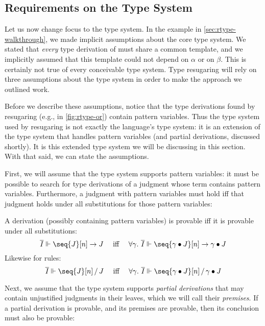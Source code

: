 \subsection{Requirements on the Type System}\label{sec:rtype-req-type}

Let us now change focus to the type system.
In the  example in \cref{sec:rtype-walkthrough}, we made implicit
assumptions about the core type system. We stated that \emph{every} type
derivation of  must share a common template,
and we implicitly assumed that this template could not depend on
$\alpha$ or on $\beta$.
This is certainly not true of every conceivable type system.
Type resugaring will rely on three assumptions about the
type system in order to make the approach we outlined work.

Before we describe these assumptions, notice that the type derivations
found by resugaring (e.g., in \cref{fig:rtype-or}) contain pattern
variables. Thus the type system used by resugaring is not exactly the
language's type system: it is an extension of the type system that
handles pattern variables (and partial derivations, discussed
shortly). It is this extended type system we will be discussing in
this section. With that said, we can state the assumptions.

First, we will assume that the type system
supports pattern variables: it
must be possible to search for type derivations of a judgment whose
term contains pattern variables. Furthermore, a judgment with pattern
variables must hold iff that judgment holds under all substitutions
for those pattern variables:

\begin{assumption}
  \label{assumption:rtype-substitution}
  A derivation (possibly containing pattern variables) is provable iff it is
  provable under all substitutions:
  \[\text{
    $\saysVD{\overline{I}}{\seq{J}[n]}{J}$
    \quad iff \quad $\Forall{\gamma} \saysVD{\overline{I}}{\seq{\Subs{\gamma}{J}}[n]}{\Subs{\gamma}{J}}$
  }\]
  Likewise for rules:
  \[\text{
    $\saysVJ{\overline{I}}{\seq{J}[n]}{J}$
    \quad iff \quad $\Forall{\gamma} \saysVJ{\overline{I}}{\seq{\Subs{\gamma}{J}}[n]}{\Subs{\gamma}{J}}$
  }\]
\end{assumption}

Next, we assume that the type system supports \emph{partial
  derivations} that may contain unjustified judgments in their leaves,
which we will call their \emph{premises}. If a partial derivation is
provable, and its premises are provable, then its conclusion must also
be provable:

